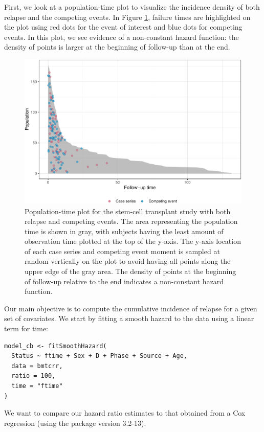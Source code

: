 First, we look at a population-time plot to visualize the incidence density of both relapse and the competing events. In Figure \ref{fig:compPop}, failure times are highlighted on the plot using red dots for the event of interest and blue dots for competing events. In this plot, we see evidence of a non-constant hazard function: the density of points is larger at the beginning of follow-up than at the end.

\begin{figure}[ht]
\includegraphics[width=\textwidth,keepaspectratio=true]{./compPop-1} \caption{Population-time plot for the stem-cell transplant study with both relapse and competing events. The area representing the population time is shown in gray, with subjects having the least amount of observation time plotted at the top of the y-axis. The y-axis location of each case series and competing event moment is sampled at random vertically on the plot to avoid having all points along the upper edge of the gray area. The density of points at the beginning of follow-up relative to the end indicates a non-constant hazard function.}\label{fig:compPop}
\end{figure}

Our main objective is to compute the cumulative incidence of relapse for a given set of covariates. We start by fitting a smooth hazard to the data using a linear term for time:

\begin{verbatim}
model_cb <- fitSmoothHazard(
  Status ~ ftime + Sex + D + Phase + Source + Age,
  data = bmtcrr,
  ratio = 100,
  time = "ftime"
)
\end{verbatim}

We want to compare our hazard ratio estimates to that obtained from a Cox regression (using the  package version 3.2-13).

